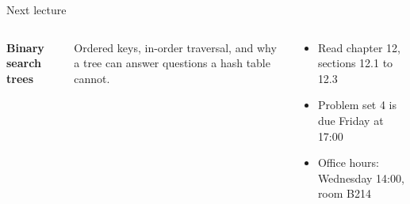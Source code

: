 \documentclass[aspectratio=169,11pt,t]{beamer}
\begin{document}
\begin{frame}{Next lecture}
  \begin{columns}[T,onlytextwidth]
      {\color{lcAccent}}\par\vspace{2mm}
      {\Large\bfseries\color{lcSlate}Binary search trees\par}
      \vspace{3mm}
      {\small Ordered keys, in-order traversal, and why a tree can
      answer questions a hash table cannot.\par}
      \begin{tcolorbox}[enhanced, arc=1.6mm, boxrule=0pt, colback=lcCode, left=3mm, right=3mm,
          top=2.5mm, bottom=2.5mm, boxsep=0pt, fontupper=\small]
        {\color{lcMuted}}\par\vspace{1.5mm}
        \begin{itemize}
          \item Read chapter 12, sections 12.1 to 12.3
          \item Problem set 4 is due Friday at 17:00
          \item Office hours: Wednesday 14:00, room B214
        \end{itemize}
      \end{tcolorbox}
  \end{columns}
\end{frame}
\end{document}

